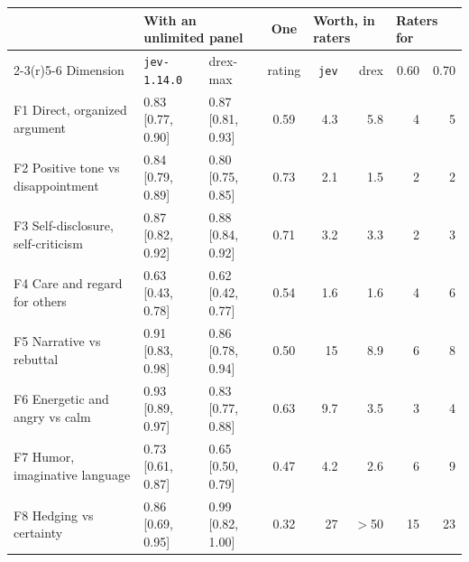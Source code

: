 {\scriptsize\setlength{\tabcolsep}{4pt}
\begin{tabular}{@{}l l l c rr rr@{}}
\toprule
 & \multicolumn{2}{l}{With an unlimited panel} & One & \multicolumn{2}{l}{Worth, in raters} & \multicolumn{2}{l}{Raters for} \\
\cmidrule(r){2-3}\cmidrule(r){5-6}\cmidrule{7-8}
Dimension & \texttt{jev-1.14.0} & drex-max & rating & \texttt{jev} & drex & 0.60 & 0.70 \\
\midrule
F1 Direct, organized argument & 0.83 {\scriptsize[0.77, 0.90]} & 0.87 {\scriptsize[0.81, 0.93]} & 0.59 & 4.3 & 5.8 & 4 & 5 \\
F2 Positive tone vs disappointment & 0.84 {\scriptsize[0.79, 0.89]} & 0.80 {\scriptsize[0.75, 0.85]} & 0.73 & 2.1 & 1.5 & 2 & 2 \\
F3 Self-disclosure, self-criticism & 0.87 {\scriptsize[0.82, 0.92]} & 0.88 {\scriptsize[0.84, 0.92]} & 0.71 & 3.2 & 3.3 & 2 & 3 \\
F4 Care and regard for others & 0.63 {\scriptsize[0.43, 0.78]} & 0.62 {\scriptsize[0.42, 0.77]} & 0.54 & 1.6 & 1.6 & 4 & 6 \\
F5 Narrative vs rebuttal & 0.91 {\scriptsize[0.83, 0.98]} & 0.86 {\scriptsize[0.78, 0.94]} & 0.50 & 15 & 8.9 & 6 & 8 \\
F6 Energetic and angry vs calm & 0.93 {\scriptsize[0.89, 0.97]} & 0.83 {\scriptsize[0.77, 0.88]} & 0.63 & 9.7 & 3.5 & 3 & 4 \\
F7 Humor, imaginative language & 0.73 {\scriptsize[0.61, 0.87]} & 0.65 {\scriptsize[0.50, 0.79]} & 0.47 & 4.2 & 2.6 & 6 & 9 \\
F8 Hedging vs certainty & 0.86 {\scriptsize[0.69, 0.95]} & 0.99 {\scriptsize[0.82, 1.00]} & 0.32 & 27 & $>$50 & 15 & 23 \\
\bottomrule
\end{tabular}}
